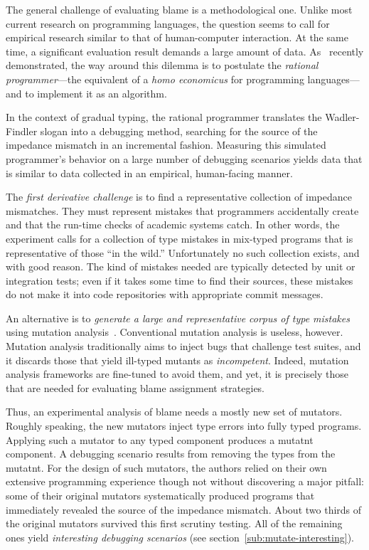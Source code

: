 
The general challenge of evaluating blame is a methodological one. Unlike most
current research on programming languages, the question seems to call for
empirical research similar to that of human-computer interaction. At the same
time, a significant evaluation result demands a large amount of
data. As~\citet{lksfd-popl-2020} recently demonstrated, the way around this
dilemma is to postulate the {\em rational programmer\/}---the equivalent of a
{\it homo economicus\/} for programming languages---and to implement it as an algorithm.

In the context of gradual typing, the rational programmer translates the
Wadler-Findler slogan into a debugging method, searching for the source of the
impedance mismatch in an incremental fashion. Measuring this simulated
programmer's behavior on a large number of debugging scenarios yields data that
is similar to data collected in an empirical, human-facing manner.

The {\em first derivative challenge\/} is to find a representative collection of
impedance mismatches. They must represent mistakes that programmers accidentally
create and that the run-time checks of academic systems catch. In other words,
the experiment calls for a collection of type mistakes in mix-typed programs
that is representative of those ``in the wild.''  Unfortunately no such
collection exists, and with good reason. The kind of mistakes needed are
typically detected by unit or integration tests; even if it takes some time to
find their sources, these mistakes do not make it into code repositories with
appropriate commit messages.

An alternative is to {\em generate a large and representative corpus of type
mistakes \/} using mutation analysis~\cite{lipton1971fault, demillo1978hints,
jia2011analysis}.  Conventional mutation analysis is useless, however. Mutation
analysis traditionally aims to inject bugs that challenge test suites, and it
discards those that yield ill-typed mutants as \emph{incompetent}.  Indeed,
mutation analysis frameworks are fine-tuned to avoid them, and yet, it is
precisely those that are needed for evaluating blame assignment strategies.

Thus, an experimental analysis of blame needs a mostly new set of mutators.
Roughly speaking, the new mutators inject type errors into fully typed programs.
Applying such a mutator to any typed component produces a mutatnt component.  A
debugging scenario results from removing the types from the mutatnt. For the
design of such mutators, the authors relied on their own extensive programming
experience though not without discovering a major pitfall: some of their
original mutators systematically produced programs that immediately revealed the
source of the impedance mismatch. About two thirds of the original mutators
survived this first scrutiny testing. All of the remaining ones yield {\em
interesting debugging scenarios\/} (see section~\ref{sub:mutate-interesting}).

